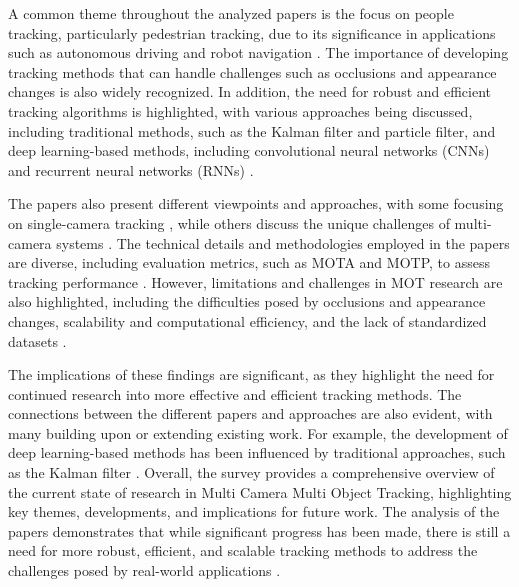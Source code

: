 \documentclass[conference]{IEEEtran}
\begin{document}
A common theme throughout the analyzed papers is the focus on people tracking, particularly pedestrian tracking, due to its significance in applications such as autonomous driving and robot navigation \cite{MOT16: A Benchmark for Multi-Object Tracking}. The importance of developing tracking methods that can handle challenges such as occlusions and appearance changes is also widely recognized. In addition, the need for robust and efficient tracking algorithms is highlighted, with various approaches being discussed, including traditional methods, such as the Kalman filter and particle filter, and deep learning-based methods, including convolutional neural networks (CNNs) and recurrent neural networks (RNNs) \cite{Multiple Object Tracking in Recent Times: A Literature Review}.

The papers also present different viewpoints and approaches, with some focusing on single-camera tracking \cite{MOTChallenge: A Benchmark for Single-Camera Multiple Target Tracking}, while others discuss the unique challenges of multi-camera systems \cite{Challenge of Multi-Camera Tracking}. The technical details and methodologies employed in the papers are diverse, including evaluation metrics, such as MOTA and MOTP, to assess tracking performance \cite{MOT16: A Benchmark for Multi-Object Tracking}. However, limitations and challenges in MOT research are also highlighted, including the difficulties posed by occlusions and appearance changes, scalability and computational efficiency, and the lack of standardized datasets \cite{Multiple Object Tracking: A Literature Review}.

The implications of these findings are significant, as they highlight the need for continued research into more effective and efficient tracking methods. The connections between the different papers and approaches are also evident, with many building upon or extending existing work. For example, the development of deep learning-based methods has been influenced by traditional approaches, such as the Kalman filter \cite{Deep Learning for Multi-Object Tracking}. Overall, the survey provides a comprehensive overview of the current state of research in Multi Camera Multi Object Tracking, highlighting key themes, developments, and implications for future work. The analysis of the papers demonstrates that while significant progress has been made, there is still a need for more robust, efficient, and scalable tracking methods to address the challenges posed by real-world applications \cite{MOTChallenge: A Benchmark for Single-Camera Multiple Target Tracking}.
\end{document}
